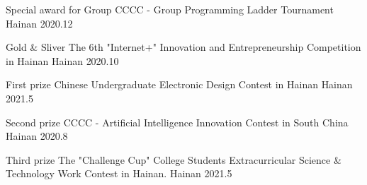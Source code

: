 

\begin{cvhonors}
	
\cvhonor
{Special award for Group} %
{CCCC - Group Programming Ladder Tournament} %
{Hainan} %
{2020.12} %

\cvhonor
{Gold \& Sliver} %
{The 6th "Internet+" Innovation and Entrepreneurship Competition in Hainan} %
{Hainan} %
{2020.10} %

\cvhonor
{First prize} %
{Chinese Undergraduate Electronic Design Contest in Hainan} %
{Hainan} %
{2021.5} %

\cvhonor
{Second prize} %
{CCCC - Artificial Intelligence Innovation Contest in South China} %
{Hainan} %
{2020.8} %

\cvhonor
{Third prize} %
{The "Challenge Cup" College Students Extracurricular Science \& Technology Work Contest in Hainan.} %
{Hainan} %
{2021.5} %

\end{cvhonors}
